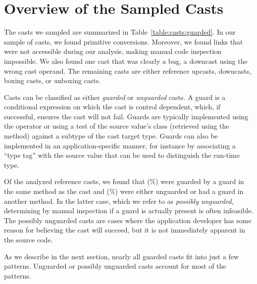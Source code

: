 
\section{Overview of the Sampled Casts}
\label{sec:casts:overview}

The casts we sampled are summarized in Table~\ref{table:casts:guarded}.
In our sample of \nSize{} casts,
we found \nPrimitivePattern{} primitive conversions.
Moreover, we found \nBrokenLink{} links that were not accessible during our
analysis, making manual code inspection impossible.
We also found one cast that was clearly a bug,
a downcast using the wrong cast operand.
The remaining \nReference{} casts are either reference upcasts, downcasts, boxing
casts, or unboxing casts.



Casts can be classified as either \emph{guarded} or \emph{unguarded} casts.
A guard is a conditional expression on which the cast is control dependent,
which, if successful, ensures the cast will not fail.
Guards are typically implemented using the  operator or using
a test of the source value's class (retrieved using the
 method) against a subtype of the cast target type.
Guards can also be implemented in an application-specific manner, for instance
by associating a ``type tag'' with the source value that can be used to
distinguish the run-time type.

Of the \nReference{} analyzed reference casts,
we found that \nGuarded{} (\pGuarded\%) were guarded by a
guard in the same method as the cast and \nUnguarded{} (\pUnguarded\%)
were either unguarded or had a guard in another method.
In the latter case, which we refer to as \emph{possibly unguarded},
determining by manual inspection if a guard is actually
present is often infeasible. The possibly unguarded casts are cases where the application developer
has some reason for believing the cast will succeed, but it is not immediately
apparent in the source code.

As we describe in the next section, nearly all guarded casts fit into just a
few patterns. Unguarded or possibly unguarded casts account for most of the
patterns.